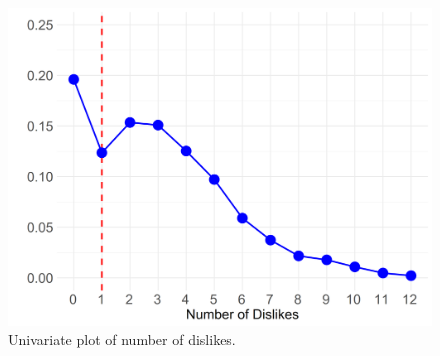 \documentclass[12pt]{article}
\begin{document}
\begin{figure}[ht!]
        \includegraphics[width=1.0\textwidth]{Plots/uni-dist-cat-tol.png}
    \caption{Univariate plot of number of dislikes.}
    \label{fig:main}
\end{figure}
\end{document}
